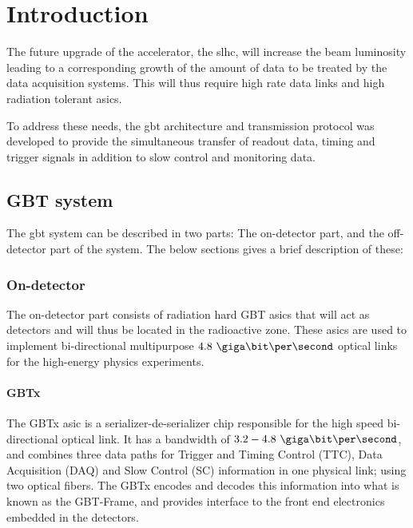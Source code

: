 \documentclass[main.tex]{subfiles}
\begin{document}
\chapter{Introduction}
The future upgrade of the  accelerator, the \gls{slhc}, will increase the beam luminosity leading to a corresponding growth of the amount of data to be treated by the data acquisition systems. This will thus require high rate data links and high radiation tolerant \glspl{asic}.

To address these needs, the \gls{gbt} architecture and transmission protocol was developed to provide the simultaneous transfer of readout data, timing and trigger signals in addition to slow control and monitoring data. \\

\section{GBT system}
The \gls{gbt} system can be described in two parts: The on-detector part, and the off-detector part of the system. The below sections gives a brief description of these:

\subsection{On-detector}
The on-detector part consists of radiation hard GBT \acrshort{asic}s that will act as detectors and will thus be located in the radioactive zone. These \glspl{asic} are used to implement bi-directional multipurpose $4.8~\giga\bit\per\second$ optical links for the high-energy physics experiments.

\subsubsection{GBTx}
The GBTx \gls{asic} is a serializer-de-serializer chip responsible for the high speed bi-directional optical link. It has a bandwidth of $3.2 - 4.8~\giga\bit\per\second$, and combines three data paths for Trigger and Timing Control (TTC), Data Acquisition (DAQ) and Slow Control (SC) information in one physical link; using two optical fibers. The GBTx encodes and decodes this information into what is known as the GBT-Frame, and provides interface to the front end electronics embedded in the detectors. \cite{gbtxman11}
\end{document}
